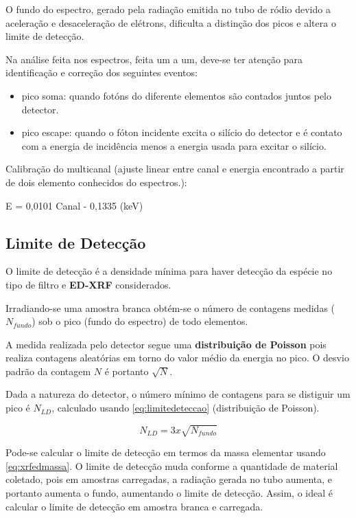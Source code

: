 O fundo do espectro, gerado pela radiação emitida no tubo de ródio
devido a aceleração e desaceleração de elétrons, dificulta a distinção 
dos picos e altera o limite de detecção. 

Na análise feita nos espectros, feita um a um, deve-se ter atenção 
para identificação e correção dos seguintes eventos: 

\begin{itemize}
  \item pico soma: quando fotóns do diferente elementos são contados
        juntos pelo detector. 
  \item pico escape: quando o fóton incidente excita o silício do detector
        e é contato com a energia de incidência menos a energia usada para excitar o silício. 
\end{itemize}

Calibração do multicanal (ajuste linear entre canal e energia 
encontrado a partir de dois elemento conhecidos do espectros.): 

E = 0,0101 Canal - 0,1335 (keV)

\subsection{Limite de Detecção}

O limite de detecção é a densidade mínima para haver 
detecção da espécie no tipo de filtro e \textbf{ED-XRF} considerados. 

Irradiando-se uma amostra branca obtém-se o número de contagens 
medidas ($N_{fundo}$) sob o pico (fundo do espectro) de todo elementos.

A medida realizada pelo detector segue uma \textbf{distribuição de Poisson}
pois realiza contagens aleatórias em torno do valor médio da energia 
no pico. O desvio padrão da contagem $N$ é portanto $\sqrt{N}$.

Dada a natureza do detector, o número mínimo de contagens para se 
distiguir um pico é $N_{LD}$, calculado usando \ref{eq:limitedeteccao} 
(distribuição de Poisson).

\begin{equation}
  \label{eq:limitedeteccao}
  N_{LD} = 3 x \sqrt{N_{fundo}}
\end{equation}

Pode-se calcular o limite de detecção em termos da massa 
elementar usando \ref{eq:xrfedmassa}.
O limite de detecção muda conforme a quantidade de material coletado,
pois em amostras carregadas, a radiação gerada no tubo aumenta, e 
portanto aumenta o fundo, aumentando o limite de detecção. 
Assim, o ideal é calcular o limite de detecção
em amostra branca e carregada.

